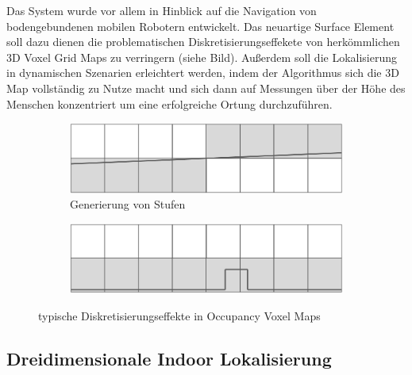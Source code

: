 Das System wurde vor allem in Hinblick auf die Navigation von bodengebundenen mobilen Robotern entwickelt. Das neuartige Surface Element soll dazu dienen die problematischen Diskretisierungseffekete von herkömmlichen 3D Voxel Grid Maps zu verringern (siehe Bild). Außerdem soll die Lokalisierung in dynamischen Szenarien erleichtert werden, indem der Algorithmus sich die 3D Map vollständig zu Nutze macht und sich dann auf Messungen über der Höhe des Menschen konzentriert um eine erfolgreiche Ortung durchzuführen.
\mbox{}
\begin{figure}
  \begin{subfigure}[t]{.5\textwidth}
    \centering
    \includegraphics[width=.9\linewidth]{pic/loesungen/12a_steps.png}
    \caption{Generierung von Stufen}
    \label{fig:s_12steps}
  \end{subfigure}\hfill
  \begin{subfigure}[t]{.5\textwidth}
    \centering
    \includegraphics[width=.9\linewidth]{pic/loesungen/12b_bumps.png}
    \caption{}
    \label{fig:s_12bumps}
  \end{subfigure}
  \caption{typische Diskretisierungseffekte in Occupancy Voxel Maps \cite{3DsurfelGridMaps}}
  \label{fig:discretization_effects}
\end{figure}
\mbox{}


\newpage
\subsection{Dreidimensionale Indoor Lokalisierung}\label{subsec:3d_indoor}
